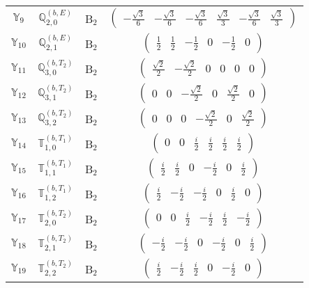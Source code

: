 \documentclass[fleqn,10pt,landscape]{article}
\begin{document}
\begin{itemize}
\begin{center}
\begin{longtable}{c|c|c|c}
$ \mathbb{Y}_{9} $ & $\mathbb{Q}_{2,0}^{(b,E)}$ & B$_{2}$ & $\begin{pmatrix} - \frac{\sqrt{3}}{6} & - \frac{\sqrt{3}}{6} & - \frac{\sqrt{3}}{6} & \frac{\sqrt{3}}{3} & - \frac{\sqrt{3}}{6} & \frac{\sqrt{3}}{3} \end{pmatrix}$ \\
$ \mathbb{Y}_{10} $ & $\mathbb{Q}_{2,1}^{(b,E)}$ & B$_{2}$ & $\begin{pmatrix} \frac{1}{2} & \frac{1}{2} & - \frac{1}{2} & 0 & - \frac{1}{2} & 0 \end{pmatrix}$ \\
$ \mathbb{Y}_{11} $ & $\mathbb{Q}_{3,0}^{(b,T_{2})}$ & B$_{2}$ & $\begin{pmatrix} \frac{\sqrt{2}}{2} & - \frac{\sqrt{2}}{2} & 0 & 0 & 0 & 0 \end{pmatrix}$ \\
$ \mathbb{Y}_{12} $ & $\mathbb{Q}_{3,1}^{(b,T_{2})}$ & B$_{2}$ & $\begin{pmatrix} 0 & 0 & - \frac{\sqrt{2}}{2} & 0 & \frac{\sqrt{2}}{2} & 0 \end{pmatrix}$ \\
$ \mathbb{Y}_{13} $ & $\mathbb{Q}_{3,2}^{(b,T_{2})}$ & B$_{2}$ & $\begin{pmatrix} 0 & 0 & 0 & - \frac{\sqrt{2}}{2} & 0 & \frac{\sqrt{2}}{2} \end{pmatrix}$ \\
$ \mathbb{Y}_{14} $ & $\mathbb{T}_{1,0}^{(b,T_{1})}$ & B$_{2}$ & $\begin{pmatrix} 0 & 0 & \frac{i}{2} & \frac{i}{2} & \frac{i}{2} & \frac{i}{2} \end{pmatrix}$ \\
$ \mathbb{Y}_{15} $ & $\mathbb{T}_{1,1}^{(b,T_{1})}$ & B$_{2}$ & $\begin{pmatrix} \frac{i}{2} & \frac{i}{2} & 0 & - \frac{i}{2} & 0 & \frac{i}{2} \end{pmatrix}$ \\
$ \mathbb{Y}_{16} $ & $\mathbb{T}_{1,2}^{(b,T_{1})}$ & B$_{2}$ & $\begin{pmatrix} \frac{i}{2} & - \frac{i}{2} & - \frac{i}{2} & 0 & \frac{i}{2} & 0 \end{pmatrix}$ \\
$ \mathbb{Y}_{17} $ & $\mathbb{T}_{2,0}^{(b,T_{2})}$ & B$_{2}$ & $\begin{pmatrix} 0 & 0 & \frac{i}{2} & - \frac{i}{2} & \frac{i}{2} & - \frac{i}{2} \end{pmatrix}$ \\
$ \mathbb{Y}_{18} $ & $\mathbb{T}_{2,1}^{(b,T_{2})}$ & B$_{2}$ & $\begin{pmatrix} - \frac{i}{2} & - \frac{i}{2} & 0 & - \frac{i}{2} & 0 & \frac{i}{2} \end{pmatrix}$ \\
$ \mathbb{Y}_{19} $ & $\mathbb{T}_{2,2}^{(b,T_{2})}$ & B$_{2}$ & $\begin{pmatrix} \frac{i}{2} & - \frac{i}{2} & \frac{i}{2} & 0 & - \frac{i}{2} & 0 \end{pmatrix}$ \\
\end{longtable}
\end{center}


\end{itemize}
\end{document}
